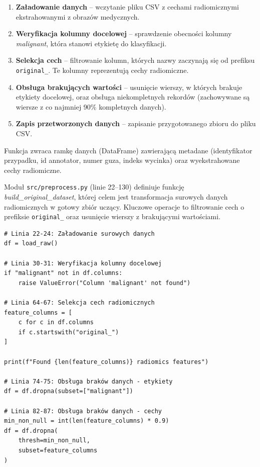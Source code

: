\documentclass[12pt]{article}
\begin{document}
\begin{enumerate}
    \item \textbf{Załadowanie danych} – wczytanie pliku CSV z cechami radiomicznymi ekstrahowanymi z obrazów medycznych.
    \item \textbf{Weryfikacja kolumny docelowej} – sprawdzenie obecności kolumny \textit{malignant}, która stanowi etykietę do klasyfikacji.
    \item \textbf{Selekcja cech} – filtrowanie kolumn, których nazwy zaczynają się od prefiksu \texttt{original\_}. Te kolumny reprezentują cechy radiomiczne.
    \item \textbf{Obsługa brakujących wartości} – usunięcie wierszy, w których brakuje etykiety docelowej, oraz obsługa niekompletnych rekordów (zachowywane są wiersze z co najmniej 90\% kompletnych danych).
    \item \textbf{Zapis przetworzonych danych} – zapisanie przygotowanego zbioru do pliku CSV.
\end{enumerate}

\noindent
Funkcja zwraca ramkę danych (DataFrame) zawierającą metadane (identyfikator przypadku, id annotator, numer guza, indeks wycinka) oraz wyekstrahowane cechy radiomiczne.

\begin{tcolorbox}[colframe=brown!75!black, colback=brown!10, title={\large Funkcja budowania zestawu danych}, fonttitle=\bfseries]
Moduł \texttt{src/preprocess.py} (linie 22–130) definiuje funkcję \textit{build\_original\_dataset}, której celem jest transformacja surowych danych radiomicznych w gotowy zbiór uczący. Kluczowe operacje to filtrowanie cech o prefiksie \texttt{original\_} oraz usunięcie wierszy z brakującymi wartościami.
\end{tcolorbox}

\begin{lstlisting}[caption={\texttt{src/preprocess.py} (linie 22--88): Budowanie i czyszczenie zestawu danych}]
# Linia 22-24: Załadowanie surowych danych
df = load_raw()

# Linia 30-31: Weryfikacja kolumny docelowej
if "malignant" not in df.columns:
    raise ValueError("Column 'malignant' not found")

# Linia 64-67: Selekcja cech radiomicznych
feature_columns = [
    c for c in df.columns
    if c.startswith("original_")
]

print(f"Found {len(feature_columns)} radiomics features")

# Linia 74-75: Obsługa braków danych - etykiety
df = df.dropna(subset=["malignant"])

# Linia 82-87: Obsługa braków danych - cechy
min_non_null = int(len(feature_columns) * 0.9)
df = df.dropna(
    thresh=min_non_null,
    subset=feature_columns
)
\end{lstlisting}
\end{document}
